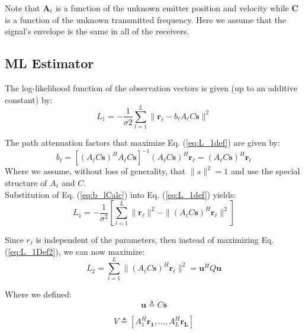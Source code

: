 Note that $\mathbf{A_\ell}$  is a function of the unknown emitter position and velocity while $\mathbf{C}$ is a function of the unknown transmitted frequency.
Here we assume that the signal's envelope is the same in all of the receivers.

\subsection{ML Estimator}

The log-likelihood function of the observation vectors is given (up to an additive constant) by:
\begin{equation}
\label{eq:L_1def}
L_1 = -\frac{1}{\sigma{2}} \sum_{l=1}^{L} \|\mathbf{r_\ell} - b_\ell A_\ell C \mathbf{s}\|^2                                                             
\end{equation}

The path attenuation factors that maximize Eq. (\ref{eq:L_1def}) are given by:
\begin{equation}
\label{eq:b_lCalc}
b_\ell = [(A_\ell C \mathbf{s})^{H} A_\ell C \mathbf{s}]^{-1}(A_\ell C \mathbf{s})^{H} \mathbf{r_\ell} = (A_\ell C \mathbf{s})^{H} \mathbf{r_\ell}
\end{equation}
Where we assume, without loss of generality, that $\|s \|^{2}=1$ and use the special structure of $A_\ell$
and $C$.\\
Substitution of Eq. (\ref{eq:b_lCalc}) into Eq. (\ref{eq:L_1def}) yields:
\begin{equation}
\label{eq:L_1Def2}
L_1=-\frac{1}{\sigma^2} [\sum_{l=1}^{L}\|\mathbf{r_\ell}\|^2 -\|(A_\ell C \mathbf{s})^H \mathbf{r_\ell}\|^2]
\end{equation}

Since $r_\ell$ is independent of the parameters, then instead of maximizing Eq. (\ref{eq:L_1Def2}), we can now maximize:
\begin{equation}
\label{eq:L_2Def}
L_2=\sum_{l=1}^{L}\|(A_\ell C \mathbf{s})^H \mathbf{r_\ell}\|^2=\mathbf{u}^HQ\mathbf{u}
\end{equation}

Where we defined:
\begin{equation}
\mathbf{u} \triangleq C \mathbf{s}
\end{equation}

\begin{equation}
V \triangleq [A_1^H \mathbf{r_1},\dots,A_L^H \mathbf{r_L}]                                                        
\end{equation}

